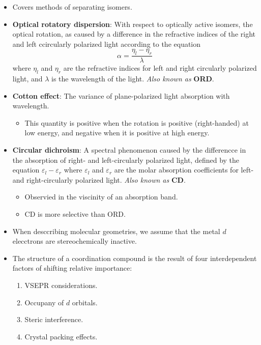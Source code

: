 \documentclass[../notes.tex]{subfiles}
\begin{document}
\begin{itemize}
    \item Covers methods of separating isomers.
    \item \textbf{Optical rotatory dispersion}: With respect to optically active isomers, the optical rotation, as caused by a difference in the refractive indices of the right and left ccircularly polarized light according to the equation
    \begin{equation*}
        \alpha = \frac{\eta_l-\eta_r}{\lambda}
    \end{equation*}
    where $\eta_l$ and $\eta_r$ are the refractive indices for left and right circularly polarized light, and $\lambda$ is the wavelength of the light. \emph{Also known as} \textbf{ORD}.
    \item \textbf{Cotton effect}: The variance of plane-polarized light absorption with wavelength.
    \begin{itemize}
        \item This quantity is positive when the rotation is positive (right-handed) at low energy, and negative when it is positive at high energy.
    \end{itemize}
    \item \textbf{Circular dichroism}: A spectral phenomenon caused by the differencce in the absorption of right- and left-circularly polarized light, defined by the equation $\varepsilon_l-\varepsilon_r$ where $\varepsilon_l$ and $\varepsilon_r$ are the molar absorption coefficients for left- and right-circularly polarized light. \emph{Also known as} \textbf{CD}.
    \begin{itemize}
        \item Observied in the viscinity of an absorption band.
        \item CD is more selective than ORD.
    \end{itemize}
    \item When desccribing molecular geometries, we assume that the metal $d$ elecctrons are stereochemically inactive.
    \item The structure of a coordination compound is the result of four interdependent factors of shifting relative importance:
    \begin{enumerate}
        \item VSEPR considerations.
        \item Occupany of $d$ orbitals.
        \item Steric interference.
        \item Crystal packing effects.
        \begin{itemize}[label={\scriptsize$\blacksquare$}]

\end{itemize}
\end{enumerate}
\end{itemize}
\end{document}

